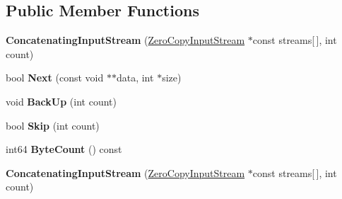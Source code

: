 \subsection*{Public Member Functions}
\begin{DoxyCompactItemize}
\item 
\mbox{\label{classgoogle_1_1protobuf_1_1io_1_1ConcatenatingInputStream_ae48c1afc50ff861af077d4486a192e1a}} 
{\bfseries Concatenating\+Input\+Stream} (\hyperlink{classgoogle_1_1protobuf_1_1io_1_1ZeroCopyInputStream}{Zero\+Copy\+Input\+Stream} $\ast$const streams\mbox{[}$\,$\mbox{]}, int count)
\item 
\mbox{\label{classgoogle_1_1protobuf_1_1io_1_1ConcatenatingInputStream_a2950e3caca4385497cca52c5b2b520ae}} 
bool {\bfseries Next} (const void $\ast$$\ast$data, int $\ast$size)
\item 
\mbox{\label{classgoogle_1_1protobuf_1_1io_1_1ConcatenatingInputStream_afd0bbc05edcb7aff298ca47c4f9e5711}} 
void {\bfseries Back\+Up} (int count)
\item 
\mbox{\label{classgoogle_1_1protobuf_1_1io_1_1ConcatenatingInputStream_aefbcc000095bf80ced9f17353d13a1cd}} 
bool {\bfseries Skip} (int count)
\item 
\mbox{\label{classgoogle_1_1protobuf_1_1io_1_1ConcatenatingInputStream_a090b2834288fbbb915f99bf10f3cfc9f}} 
int64 {\bfseries Byte\+Count} () const
\item 
\mbox{\label{classgoogle_1_1protobuf_1_1io_1_1ConcatenatingInputStream_ae48c1afc50ff861af077d4486a192e1a}} 
{\bfseries Concatenating\+Input\+Stream} (\hyperlink{classgoogle_1_1protobuf_1_1io_1_1ZeroCopyInputStream}{Zero\+Copy\+Input\+Stream} $\ast$const streams\mbox{[}$\,$\mbox{]}, int count)
\item 
\mbox{\label{classgoogle_1_1protobuf_1_1io_1_1ConcatenatingInputStream_a2950e3caca4385497cca52c5b2b520ae}} 
$$
\end{DoxyCompactItemize}
